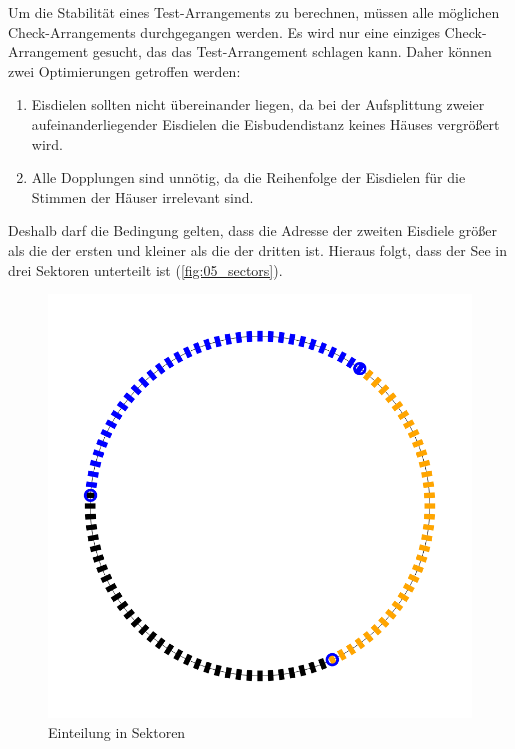\documentclass[a4paper,10pt,ngerman]{scrartcl}
\newcommand{\imageWidth}{0.3\linewidth}
\begin{document}
\medskip
Um die Stabilität eines Test-Arrangements zu berechnen, müssen alle möglichen Check-Arrangements durchgegangen werden.
Es wird nur eine einziges Check-Arrangement gesucht, das das Test-Arrangement schlagen kann.
Daher können zwei Optimierungen getroffen werden:
\begin{enumerate}
    \item Eisdielen sollten nicht übereinander liegen, da bei der Aufsplittung zweier aufeinanderliegender Eisdielen die Eisbudendistanz keines Häuses vergrößert wird.
    \item Alle Dopplungen sind unnötig, da die Reihenfolge der Eisdielen für die Stimmen der Häuser irrelevant sind.
\end{enumerate}
Deshalb darf die Bedingung gelten, dass die Adresse der zweiten Eisdiele größer als die der ersten und kleiner als die der dritten ist.
Hieraus folgt, dass der See in drei Sektoren unterteilt ist (\autoref{fig:05_sectors}).
\begin{figure}[ht]
    \centering
    \includegraphics[width=\imageWidth]{05_sectors.png}
    \caption{Einteilung in Sektoren}
    \label{fig:05_sectors}
\end{figure}
\end{document}
